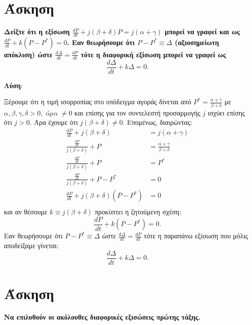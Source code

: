 \documentclass[a4paper,12pt]{article}
\begin{document}
\vspace{2\baselineskip}

\section{Άσκηση}{\bfseries Δείξτε ότι η εξίσωση $\frac{dP}{dt} + j(\beta+\delta)P = j(\alpha+\gamma)$ μπορεί να γραφεί και ως $\frac{dP}{dt} + k(P-P^*) = 0$.
Εαν θεωρήσουμε ότι $P-P^* \equiv\Delta$ (αξιοσημείωτη απόκλιση) ώστε
$\frac{d\Delta}{dt} = \frac{dP}{dt}$ τότε η διαφορική εξίσωση μπορεί να γραφεί ως
\[
\frac{d\Delta}{dt} + k\Delta =0.
\]}

\vspace{2\baselineskip}

\textbf{Λύση}:

\vspace{\baselineskip}

Ξέρουμε ότι η τιμή ισορροπίας στο υπόδειγμα αγοράς δίνεται από $P^*=\frac{\alpha+\gamma}{\beta+\delta}$ με $\alpha, \beta, \gamma, \delta >0, \;\text{άρα} \; \neq 0$ και επίσης για τον συντελεστή προσαρμογής $j$ ισχύει επίσης ότι $j>0$.
Άρα έχουμε ότι $j(\beta+\delta)\neq 0$. Επομένως, διαιρώντας:
\begin{align*}
\frac{dP}{dt} + j(\beta+\delta) &= j(\alpha + \gamma) \\
\frac{\frac{dP}{dt}}{j(\beta+\delta)} + P &= \frac{\alpha+\gamma}{\beta+\delta} \\
\frac{\frac{dP}{dt}}{j(\beta+\delta)} + P &= P^* \\
\frac{\frac{dP}{dt}}{j(\beta+\delta)} + P - P^* &= 0 \\
\frac{dP}{dt} + j(\beta+\delta)(P-P^*) &=0 \\
\end{align*}
και αν θέσουμε $k\equiv j(\beta+\delta)$ προκύπτει η ζητούμενη σχέση:
\[
\frac{dP}{dt} + k(P-P^*) = 0.
\]
Εαν θεωρήσουμε ότι $P-P^*\equiv \Delta$ ώστε $\frac{d\Delta}{dt} = \frac{dP}{dt}$ τότε η παραπάνω εξίσωση που μόλις αποδείξαμε γίνεται:
\[
\frac{d\Delta}{dt} + k\Delta = 0.
\]

\vspace{2\baselineskip}

\section{Άσκηση}{\bfseries Να επιλυθούν οι ακόλουθες διαφορικές εξισώσεις πρώτης τάξης.}

\vspace{2\baselineskip}
\end{document}
